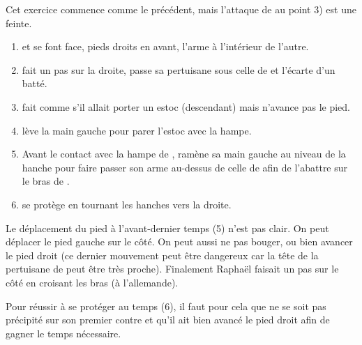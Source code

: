 \begin{technique}

Cet exercice commence comme le précédent, mais l'attaque de \A au point 3) est une feinte.
\begin{enumerate}
	\item \A et \D se font face, pieds droits en avant, l'arme à l'intérieur de l'autre.
	
	\item \A fait un pas sur la droite, passe sa pertuisane sous celle de \D et l'écarte d'un batté.
	
	\item \A fait comme s'il allait porter un estoc (descendant) mais n'avance pas le pied.
	
	\item \D lève la main gauche pour parer l'estoc avec la hampe.
	
	\item Avant le contact avec la hampe de \D, \A ramène sa main gauche au niveau de la hanche pour faire passer son arme au-dessus de celle de \D afin de l'abattre sur le bras de \D.
	
	\item \D se protège en tournant les hanches vers la droite.
\end{enumerate}

Le déplacement du pied à l'avant-dernier temps (5) n'est pas clair. On peut déplacer le pied gauche sur le côté. On peut aussi ne pas bouger, ou bien avancer le pied droit (ce dernier mouvement peut être dangereux car la tête de la pertuisane de \D peut être très proche). Finalement Raphaël faisait un pas sur le côté en croisant les bras (à l'allemande).

Pour réussir à se protéger au temps (6), il faut pour cela que \D ne se soit pas précipité sur son premier contre et qu'il ait bien avancé le pied droit afin de gagner le temps nécessaire.

\end{technique}
